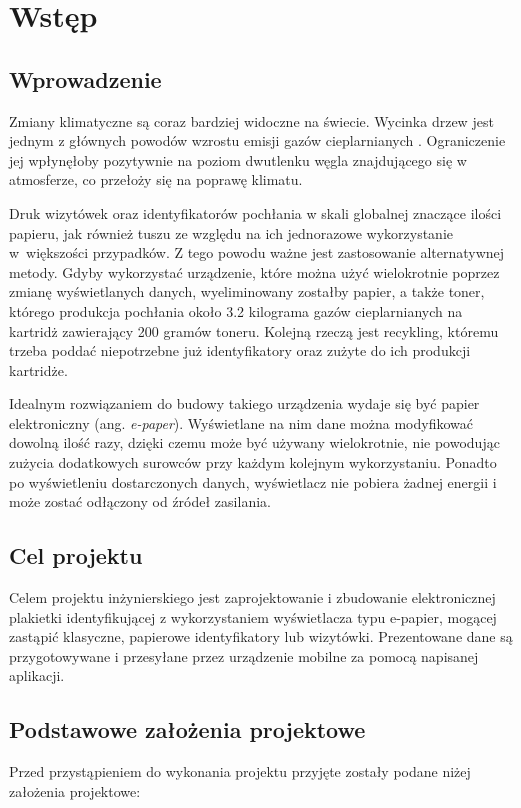 \documentclass[a4paper,12pt, twoside]{article}
\begin{document}
    	\section{Wstęp}
    	
    	\subsection{Wprowadzenie}
    	Zmiany klimatyczne są coraz bardziej widoczne na świecie. Wycinka drzew jest jednym z głównych powodów wzrostu emisji gazów cieplarnianych \cite{clima_causes}. Ograniczenie jej wpłynęłoby pozytywnie na poziom dwutlenku węgla znajdującego się w atmosferze, co przełoży się na poprawę klimatu. 
    	
    	Druk wizytówek oraz identyfikatorów pochłania w skali globalnej znaczące ilości papieru, jak również tuszu ze względu na ich jednorazowe wykorzystanie w~większości przypadków. Z tego powodu ważne jest zastosowanie alternatywnej metody. Gdyby wykorzystać urządzenie, które można użyć wielokrotnie poprzez zmianę wyświetlanych danych, wyeliminowany zostałby papier, a także toner, którego produkcja pochłania około 3.2 kilograma gazów cieplarnianych \cite{cartidge_production} na kartridż zawierający 200 gramów toneru. Kolejną rzeczą jest recykling, któremu trzeba poddać niepotrzebne już identyfikatory oraz zużyte do ich produkcji kartridże.
    	
    	Idealnym rozwiązaniem do budowy takiego urządzenia wydaje się być papier elektroniczny (ang. \textit{e-paper}). Wyświetlane na nim dane można modyfikować dowolną ilość razy, dzięki czemu może być używany wielokrotnie, nie powodując zużycia dodatkowych surowców przy każdym kolejnym wykorzystaniu. Ponadto po wyświetleniu dostarczonych danych, wyświetlacz nie pobiera żadnej energii i może zostać odłączony od źródeł zasilania.

    	\subsection{Cel projektu}
    	Celem projektu inżynierskiego jest zaprojektowanie i zbudowanie elektronicznej plakietki identyfikującej z wykorzystaniem wyświetlacza typu e-papier, mogącej zastąpić klasyczne, papierowe identyfikatory lub wizytówki. Prezentowane dane są przygotowywane i przesyłane przez urządzenie mobilne za pomocą napisanej aplikacji.

    	\subsection{Podstawowe założenia projektowe}
    	Przed przystąpieniem do wykonania projektu przyjęte zostały podane niżej założenia projektowe:
    	
\end{document}
